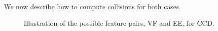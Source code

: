  
 We now describe how to compute collisions for both cases.
\begin{figure}[h!] 
\begin{minipage}[b]{0.5 \linewidth}
		\centering
	\end{minipage}
	\begin{minipage}[b]{0.5 \linewidth}
		\centering
	\end{minipage}

  \caption{Illustration of the possible feature pairs, VF and EE, for CCD.}
  \label{fig::asd}
\end{figure}

